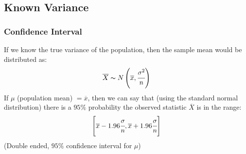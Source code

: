 \subsection{Known Variance}
\subsubsection{Confidence Interval}
If we know the true variance of the population, then the sample mean would be distributed as:
\[\overline{X} \thicksim N\left(\overline{x}, \cfrac{\sigma^2}{n} \right)\]
If $\mu$ (population mean) $= \overline{x}$, then we can say that (using the standard normal distribution) there is a $95\%$ probability the observed statistic $\overline{X}$ is in the range:
\[\left[\overline{x} - 1.96\cfrac{\sigma}{n}, \overline{x} + 1.96\cfrac{\sigma}{n} \right]\]
(Double ended, $95\%$ confidence interval for $\mu$)
